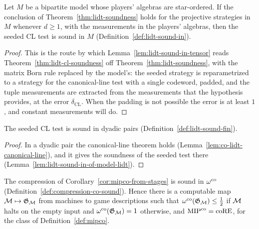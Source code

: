 \begin{lemma}
\label{lem:lidt-sound-in-of-model-lidt}
\leanok
Let $M$ be a bipartite model whose players' algebras are star-ordered. If the conclusion of
Theorem~\ref{thm:lidt-soundness} holds for the projective strategies in $M$ whenever $d \geq 1$,
with the measurements in the players' algebras, then the seeded CL test is sound in $M$
(Definition~\ref{def:lidt-sound-in}).
\end{lemma}

\begin{proof}
\leanok
This is the route by which Lemma~\ref{lem:lidt-sound-in-tensor} reads
Theorem~\ref{thm:lidt-cl-soundness} off Theorem~\ref{thm:lidt-soundness}, with the matrix Born
rule replaced by the model's: the seeded strategy is reparametrized to a strategy for the
canonical-line test with a single codeword, padded, and the tuple measurements are extracted from
the measurements that the hypothesis provides, at the error $\delta_{\mathrm{CL}}$. When the
padding is not possible the error is at least $1$, and constant measurements will do.
\end{proof}

\begin{theorem}
\label{thm:lidt-sound-fin}
\leanok
The seeded CL test is sound in dyadic pairs (Definition~\ref{def:lidt-sound-fin}).
\end{theorem}

\begin{proof}
\leanok
In a dyadic pair the canonical-line theorem holds (Lemma~\ref{lem:co-lidt-canonical-line}), and
it gives the soundness of the seeded test there (Lemma~\ref{lem:lidt-sound-in-of-model-lidt}).
\end{proof}

\begin{theorem}[$\MIPco = \coRE$]
\label{thm:mipco-eq-core-unconditional}
\leanok
The compression of Corollary~\ref{cor:mipco-from-stages} is sound in $\omega^{\mathrm{co}}$
(Definition~\ref{def:compression-co-sound}). Hence there is a computable map
$\mathcal{M} \mapsto \mathfrak{G}_{\mathcal{M}}$ from machines to game descriptions such that
$\omega^{\mathrm{co}}(\mathfrak{G}_{\mathcal{M}}) \leq \frac12$ if $\mathcal{M}$ halts on the empty input and
$\omega^{\mathrm{co}}(\mathfrak{G}_{\mathcal{M}}) = 1$ otherwise, and $\MIPco = \coRE$, for the class of
Definition~\ref{def:mipco}.
\end{theorem}

